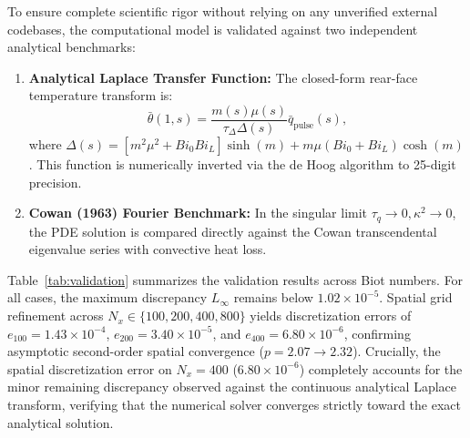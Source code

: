 \documentclass[review,12pt]{article}
\begin{document}
To ensure complete scientific rigor without relying on any unverified external codebases, the computational model is validated against two independent analytical benchmarks:
\begin{enumerate}
    \item \textbf{Analytical Laplace Transfer Function:} The closed-form rear-face temperature transform is:
    \begin{equation}
    \bar{\theta}(1, s) = \frac{m(s)\mu(s)}{\tau_\Delta \Delta(s)} \bar{q}_{\mathrm{pulse}}(s),
    \end{equation}
    where $\Delta(s) = [m^2 \mu^2 + Bi_0 Bi_L]\sinh(m) + m\mu(Bi_0 + Bi_L)\cosh(m)$. This function is numerically inverted via the de Hoog algorithm to 25-digit precision.
    \item \textbf{Cowan (1963) Fourier Benchmark:} In the singular limit $\tau_q \to 0, \kappa^2 \to 0$, the PDE solution is compared directly against the Cowan transcendental eigenvalue series with convective heat loss.
\end{enumerate}

Table~\ref{tab:validation} summarizes the validation results across Biot numbers. For all cases, the maximum discrepancy $L_\infty$ remains below $1.02 \times 10^{-5}$. Spatial grid refinement across $N_x \in \{100, 200, 400, 800\}$ yields discretization errors of $e_{100} = 1.43 \times 10^{-4}$, $e_{200} = 3.40 \times 10^{-5}$, and $e_{400} = 6.80 \times 10^{-6}$, confirming asymptotic second-order spatial convergence ($p = 2.07 \to 2.32$). Crucially, the spatial discretization error on $N_x = 400$ ($6.80 \times 10^{-6}$) completely accounts for the minor remaining discrepancy observed against the continuous analytical Laplace transform, verifying that the numerical solver converges strictly toward the exact analytical solution.
\end{document}
